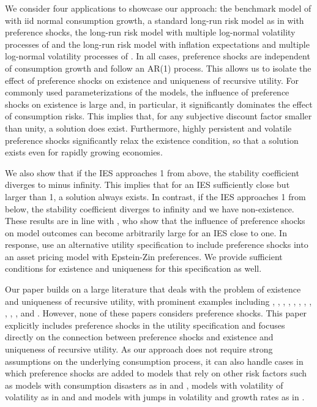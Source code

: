 \documentclass[12pt, reqno]{amsart}
\newcommand{\1}{\mathbbm 1}
\theoremstyle{plain}
\theoremstyle{definition}
\begin{document}
We consider four applications to showcase our approach: the benchmark model of
\cite{Albuquerque2016} with {\sc iid} normal consumption growth, a standard
long-run risk model as in \cite{bansal2004risks} with preference shocks, the long-run risk model with
multiple log-normal volatility processes of \cite{schorfheide2018identifying}
and the long-run risk model with inflation expectations and multiple
log-normal volatility processes of \cite{GomezYaron2020}. In all cases,
preference shocks are independent of consumption growth and follow
an AR(1) process. This allows us to isolate the effect of preference shocks
on existence and uniqueness of recursive utility. For
commonly used parameterizations of the models, the influence of preference
shocks on existence is large and, in particular, it significantly dominates
the effect of consumption risks. This implies that, for any subjective discount
factor smaller than unity, a solution does exist. Furthermore, highly persistent and
volatile preference shocks significantly relax the existence condition, so
that a solution exists even for rapidly growing economies.

We also show that if the IES approaches 1 from above, the stability
coefficient diverges to minus infinity. This implies that for an IES
sufficiently close but larger than 1, a solution always exists. In contrast, if
the IES approaches 1 from below, the stability coefficient diverges to
infinity and we have non-existence. These results are in line with
\cite{deGroot2018}, who show that the influence of preference shocks on model
outcomes can become arbitrarily large for an IES close to one. In response,
\cite{degroot2021valuation} use an alternative utility specification to
include preference shocks into an asset pricing model with Epstein-Zin
preferences. We provide sufficient conditions for existence and uniqueness for
this specification as well. 

Our paper builds on a large literature that deals with the problem
of existence and uniqueness of recursive utility, with prominent examples
including \cite{epstein1989risk}, \cite{boyd1990recursive},
\cite{marinacci2010unique}, \cite{hansen2012recursive},
\cite{bauerle2018stochastic}, \cite{becker2018recursivei},
\cite{becker2018recursiveii}, \cite{marinacci2019unique}, \cite{Pohl2019},
\cite{borovicka2020necessary}, \cite{balbus2020recursive},
\cite{bloise2021not} and \cite{christensen2022existence}. However, none of
these papers considers preference shocks. This paper explicitly includes
preference shocks in the utility specification and focuses directly on the
connection between preference shocks and existence and uniqueness of
recursive utility. As our approach does not require strong assumptions on the
underlying consumption process, it can also handle cases in which preference
shocks are added to models that rely on other risk factors such as models
with consumption disasters as in \cite{Barro2009} and \cite{Wachter2013},
models with volatility of volatility as in \cite{Bollerslev2009} and
\cite{Bollerslevetal2015} and models with jumps in volatility and growth
rates as in \cite{DrechslerYaron11}.
\end{document}
